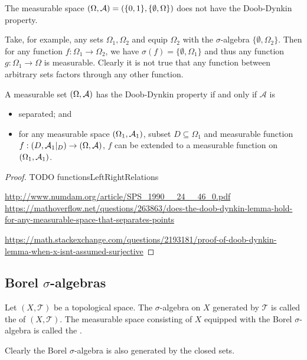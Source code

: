\begin{example}
The measurable space $\left( \Omega, \mathcal{A} \right) = \left( \{0,1\}, \{\emptyset,\Omega\} \right)$ does not have the Doob-Dynkin property. 

Take, for example, any sets $\Omega_1, \Omega_2$ and equip $\Omega_2$ with the $\sigma$-algebra $\{\emptyset, \Omega_2\}$. Then for any function $f:\Omega_1 \to \Omega_2$, we have $\sigma(f) = \{\emptyset, \Omega_1\}$ and thus any function $g: \Omega_1 \to \Omega$ is measurable. Clearly it is not true that any function between arbitrary sets factors through any other function.
\end{example}


\begin{proposition}
A measurable set $\left( \Omega,\mathcal{A} \right)$ has the Doob-Dynkin property \textup{if and only if} $\mathcal{A}$ is
\begin{itemize}
\item separated; and
\item for any measurable space $\left( \Omega_1,\mathcal{A}_1 \right)$, subset $D\subseteq \Omega_1$ and measurable function $f: \left( D,\mathcal{A}_1|_D \right) \to \left( \Omega,\mathcal{A} \right)$, $f$ can be extended to a measurable function on $\left( \Omega_1,\mathcal{A}_1 \right)$.
\end{itemize}
\end{proposition}
\begin{proof}
TODO {functionsLeftRightRelations}

\url{http://www.numdam.org/article/SPS_1990__24__46_0.pdf}
\url{https://mathoverflow.net/questions/263863/does-the-doob-dynkin-lemma-hold-for-any-measurable-space-that-separates-points}

\url{https://math.stackexchange.com/questions/2193181/proof-of-doob-dynkin-lemma-when-x-isnt-assumed-surjective}
\end{proof}

\subsection{Borel $\sigma$-algebras}
\begin{definition}
Let $(X,\mathcal{T})$ be a topological space. The $\sigma$-algebra on $X$ generated by $\mathcal{T}$ is called the  of $(X,\mathcal{T})$. The measurable space consisting of $X$ equipped with the Borel $\sigma$-algebra is called the .
\end{definition}
Clearly the Borel $\sigma$-algebra is also generated by the closed sets.

